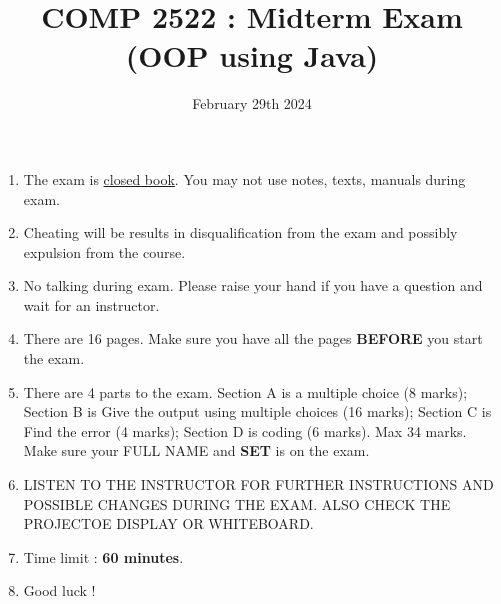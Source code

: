 \documentclass{article}
\author{}
\date{February 29th 2024}
\title{COMP 2522 : Midterm Exam (OOP using Java)}
\begin{document}
\maketitle
\begin{enumerate}
	\item The exam is \underline{closed book}. You may not use notes, texts, manuals during exam.
	\item Cheating will be results in disqualification from the exam and possibly expulsion from the course.
	\item No talking during exam. Please raise your hand if you have a question and wait for an instructor.
	\item There are 16 pages. Make sure you have all the pages \textbf{BEFORE} you start the exam.
	\item There are 4 parts to the exam. Section A is a multiple choice (8 marks); Section B is Give the output using multiple choices (16 marks); Section C is Find the error (4 marks); Section D is coding (6 marks). Max 34 marks. Make sure your FULL NAME and \textbf{SET} is on the exam.
	\item LISTEN TO THE INSTRUCTOR FOR FURTHER INSTRUCTIONS AND POSSIBLE CHANGES DURING THE EXAM. ALSO CHECK THE PROJECTOE DISPLAY OR WHITEBOARD.
	\item Time limit : \textbf{60 minutes}.
	\item Good luck !
\end{enumerate}
\newpage
\end{document}
